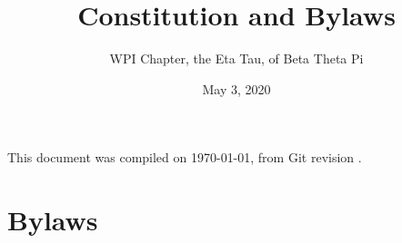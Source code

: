 \documentclass[10pt]{report}
\title{Constitution and Bylaws}
\author{WPI Chapter, the Eta Tau, of Beta Theta Pi}
\date{May 3, 2020}
\begin{document}


\begin{titlepage}
\maketitle
\end{titlepage}

\begin{center}
	\small This document was compiled on \today, from Git revision \Revision.
\end{center}
\clearpage


\clearpage

\tableofcontents
\clearpage

\renewcommand\chaptername{Article}


\setcounter{chapter}{0}
\renewcommand\chaptername{Item}
\part{Bylaws}



















\appendix

\end{document}
